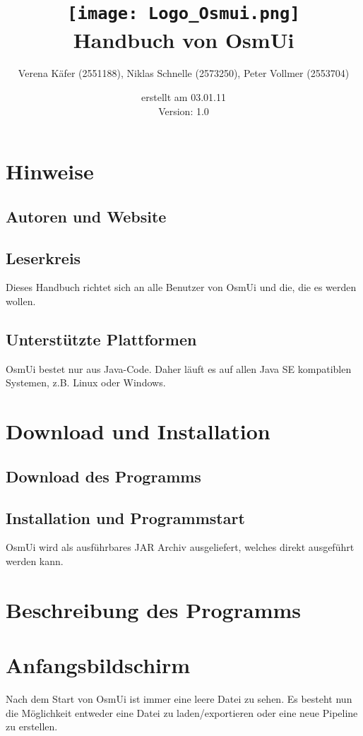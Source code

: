 \documentclass[a4paper,10pt]{scrartcl}
\author{Verena Käfer (2551188), Niklas Schnelle (2573250), Peter Vollmer (2553704)}
\date{erstellt am 03.01.11\\
Version: 1.0}
\title{\texttt{[image: Logo\_Osmui.png]} \\ 
Handbuch von OsmUi}
\begin{document}
\maketitle
\newpage
\tableofcontents
\newpage

\section{Hinweise}
\subsection{Autoren und Website}
\subsection{Leserkreis}
Dieses Handbuch richtet sich an alle Benutzer von OsmUi und die, die es werden wollen.
\subsection{Unterstützte Plattformen}
OsmUi bestet nur aus Java-Code. Daher läuft es auf allen Java SE kompatiblen Systemen, z.B. Linux oder Windows.


\section{Download und Installation}
\subsection{Download des Programms}
\subsection{Installation und Programmstart}
OsmUi wird als ausführbares JAR Archiv ausgeliefert, welches direkt ausgeführt werden kann. 

\section{Beschreibung des Programms}

\section{Anfangsbildschirm}
Nach dem Start von OsmUi ist immer eine leere Datei zu sehen. Es besteht nun die Möglichkeit entweder eine Datei zu laden/exportieren oder eine neue Pipeline zu erstellen.
\end{document}

